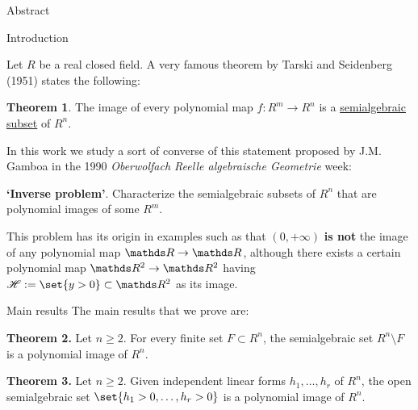 \documentclass[final]{beamer}
\newlength{\onecolwid}
\begin{document}
\begin{frame}[t]
\begin{columns}[t]
\begin{column}{\onecolwid}
\begin{alertblock}{Abstract}
\end{alertblock}
 \vspace{-0.3cm}


\begin{block}{Introduction}
 
Let $R$ be a real closed field. A very famous theorem by Tarski and Seidenberg (1951) states the following:\vspace{0.4cm}

\textbf{Theorem 1}.
The image of every polynomial map $f:R^m\to R^n$ is a \hyperref[semialgSet]{semialgebraic subset} of $R^n$.
\vspace{0.4cm}
 
In this work we study a sort of converse of this statement proposed by J.M. Gamboa in the 1990 \emph{Oberwolfach Reelle algebraische Geometrie} week:
\vspace{0.4cm}

\textbf{`Inverse problem'}. 
Characterize the semialgebraic subsets of $R^n$ that are polynomial images of some $R^m$.
\vspace{0.4cm}

This problem has its origin in examples such as that $(0,+\infty)$ \textbf{is not} the image of any polynomial map $\R\to\R$, although 
there exists a certain polynomial map $\R^2\to\R^2$ having $\H:=\set{y>0}\subset\R^2$ as its image.
\vspace{-1.3cm}
\end{block}

\begin{block}{Main results}
The main results that we prove are:
\vspace{0.4cm}

\textbf{Theorem 2.}
Let $n\ge2$. For every finite set $F\subset R^n$, the semialgebraic set $R^n\setminus F$ is a polynomial image of $R^n$.
\vspace{0.4cm}

\textbf{Theorem 3.}
Let $n\ge 2$. Given independent linear forms $h_1,\dots,h_r$ of $R^n$, the open semialgebraic set $\set{h_1>0,\dots,h_r>0}$ is a polynomial image of $R^n$.
\vspace{0.4cm}


\end{block}
\end{column}
\end{columns}
\end{frame}
\end{document}
